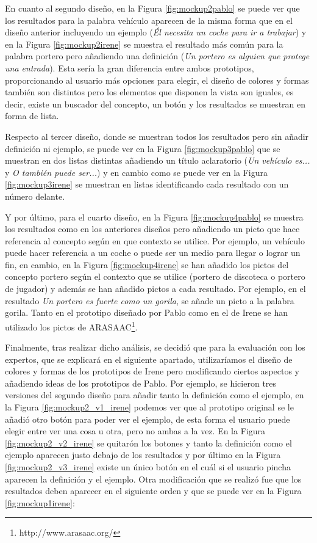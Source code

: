 En cuanto al segundo diseño, en la Figura \ref{fig:mockup2pablo} se puede ver que los resultados para la palabra vehículo aparecen de la misma forma que en el diseño anterior incluyendo un ejemplo (\textit{Él necesita un coche para ir a trabajar}) y en la Figura \ref{fig:mockup2irene} se muestra el resultado más común para la palabra portero pero añadiendo una definición (\textit{Un portero es alguien que protege una entrada}). Esta sería la gran diferencia entre ambos prototipos, proporcionando al usuario más opciones para elegir, el diseño de colores y formas también son distintos pero los elementos que disponen la vista son iguales, es decir, existe un buscador del concepto, un botón y los resultados se muestran en forma de lista.

Respecto al tercer diseño, donde se muestran todos los resultados pero sin añadir definición ni ejemplo, se puede ver en la Figura \ref{fig:mockup3pablo} que se muestran en dos listas distintas añadiendo un título aclaratorio (\textit{Un vehículo es...} y \textit{O también puede ser...}) y en cambio como se puede ver en la Figura \ref{fig:mockup3irene} se muestran en listas identificando cada resultado con un número delante.

Y por último, para el cuarto diseño, en la Figura \ref{fig:mockup4pablo} se muestra los resultados como en los anteriores diseños pero añadiendo un picto que hace referencia al concepto según en que contexto se utilice. Por ejemplo, un vehículo puede hacer referencia a un coche o puede ser un medio para llegar o lograr un fin, en cambio, en la Figura \ref{fig:mockup4irene} se han añadido los pictos del concepto portero según el contexto que se utilice (portero de discoteca o portero de jugador) y además se han añadido pictos a cada resultado. Por ejemplo, en el resultado \textit{Un portero es fuerte como un gorila}, se añade un picto a la palabra gorila. 
Tanto en el prototipo diseñado por Pablo como en el de Irene se han utilizado los pictos de ARASAAC\footnote{http://www.arasaac.org/}.

Finalmente, tras realizar dicho análisis, se decidió que para la evaluación con los expertos, que se explicará en el siguiente apartado, utilizaríamos el diseño de colores y formas de los prototipos de Irene pero modificando ciertos aspectos y añadiendo ideas de los prototipos de Pablo. Por ejemplo, se hicieron tres versiones del segundo diseño para añadir tanto la definición como el ejemplo, en la Figura \ref{fig:mockup2_v1_irene} podemos ver que al prototipo original se le añadió otro botón para poder ver el ejemplo, de esta forma el usuario puede elegir entre ver una cosa u otra, pero no ambas a la vez. En la Figura \ref{fig:mockup2_v2_irene} se quitarón los botones y tanto la definición como el ejemplo aparecen justo debajo de los resultados y por último en la Figura \ref{fig:mockup2_v3_irene} existe un único botón en el cuál si el usuario pincha aparecen la definición y el ejemplo.
Otra modificación que se realizó fue que los resultados deben aparecer en el siguiente orden y que se puede ver en la Figura \ref{fig:mockup1irene}:

